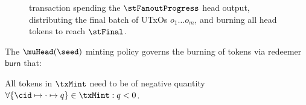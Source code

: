 \begin{figure}[H]
  \centering
  
  \caption{\mtxFinalPartialFanout{} transaction spending the $\stFanoutProgress$ head output,
    distributing the final batch of UTxOs $o_{1} \dots o_{m}$, and burning all head tokens to reach $\stFinal$.}\label{fig:finalPartialFanoutTx}
\end{figure}

\noindent The $\muHead(\seed)$ minting policy governs the burning of tokens via
redeemer $\mathsf{burn}$ that:
\begin{menumerate}
	\item All tokens in $\txMint$ need to be of negative quantity
	$\forall \{\cid \mapsto \cdot \mapsto q\} \in \txMint : q < 0$.
\end{menumerate}

\FloatBarrier{}

